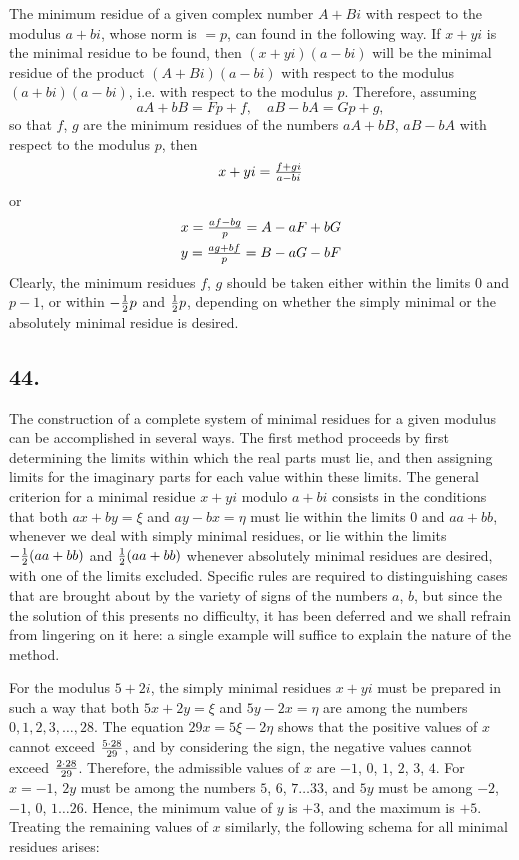 \documentclass[twoside,12pt]{memoir}
\let\oldfrac\frac
\def\frac#1#2{\mathchoice{\tfrac{#1}{#2}}{\oldfrac{#1}{#2}}{\genfrac{}{}{}{2}{#1}{#2\mathstrut}}{\genfrac{}{}{}{3}{#1}{#2\mathstrut}}}
\begin{document}
The minimum residue of a given complex number \(A+Bi\) with respect to the modulus \(a+bi\), whose norm is \(=p\), can found in the following way. If \(x+yi\) is the minimal residue to be found, then \((x+yi)(a-bi)\) will be the minimal residue of the product \((A+Bi)(a-bi)\) with respect to the modulus \((a+bi)(a-bi)\), i{.}e{.} with respect to the modulus \(p\). Therefore, assuming
\[a A+ b B = F p + f, \quad a B - b A = G p + g,\]
so that \(f\), \(g\) are the minimum residues of the numbers \(aA + bB\), \(aB - bA\) with respect to the modulus \(p\), then
\[x+yi=\frac{f+gi}{a-bi}\]
or
\[\begin{aligned}
& x=\frac{af-bg}{p}=A-aF+bG \\
& y=\frac{ag+bf}{p}=B-aG-bF
\end{aligned}\]
Clearly, the minimum residues \(f\), \(g\) should be taken either within the limits \(0\) and \(p-1\), or within \(-\frac{1}{2}p\) and \(\frac{1}{2}p\), depending on whether the simply minimal or the absolutely minimal residue is desired.
%

\subsection*{44.}

The construction of a complete system of minimal residues for a given modulus can be accomplished in several ways. The first method proceeds by first determining the limits within which the real parts must lie, and then assigning limits for the imaginary parts for each value within these limits. The general criterion for a minimal residue \(x+yi\) modulo \(a+bi\) consists in the conditions that both \(ax+by=\xi\) and \(ay-bx=\eta\) must lie within the limits \(0\) and \(aa+bb\), whenever we deal with simply minimal residues, or lie within the limits \(-\frac{1}{2}(aa+bb)\) and \(\frac{1}{2}(aa+bb)\) whenever absolutely minimal residues are desired, with one of the limits excluded. Specific rules are required to distinguishing cases that are brought about by the variety of signs of the numbers \(a\), \(b\), but since the the solution of this presents no difficulty, it has been deferred and we shall refrain from lingering on it here: a single example will suffice to explain the nature of the method. 
%

For the modulus \(5+2i\), the simply minimal residues \(x+yi\) must be prepared in such a way that both \(5x+2y=\xi\) and \(5y-2x=\eta\) are among the numbers \(0, 1, 2, 3, \ldots, 28\). The equation \(29x=5\xi-2\eta\) shows that the positive values of \(x\) cannot exceed \(\frac{5 \cdot 28}{29}\), and by considering the sign, the negative values cannot exceed \(\frac{2 \cdot 28}{29}\). Therefore, the admissible values of \(x\) are \(-1\), \(0\), \(1\), \(2\), \(3\), \(4\). For \(x=-1\), \(2y\) must be among the numbers \(5\), \(6\), \(7 \ldots 33\), and \(5y\) must be among \(-2\), \(-1\), \(0\), \(1 \ldots 26\). Hence, the minimum value of \(y\) is \(+3\), and the maximum is \(+5\). Treating the remaining values of \(x\) similarly, the following schema for all minimal residues arises:
\end{document}
